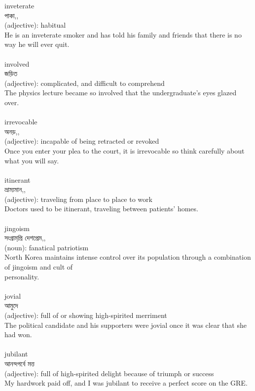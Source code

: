 \documentclass{article}
\begin{document}
{inveterate}\\
{পাকা,,}\\
{(adjective): habitual\\He is an inveterate smoker and has told his family and friends that there is no way he will ever quit.\\}\\
{involved}\\
{জড়িত}\\
{(adjective): complicated, and difficult to comprehend\\The physics lecture became so involved that the undergraduate's eyes glazed over.\\}\\
{irrevocable}\\
{অনড়,,}\\
{(adjective): incapable of being retracted or revoked\\Once you enter your plea to the court, it is irrevocable so think carefully about what you will say.\\}\\
{itinerant}\\
{ভ্রাম্যমান,,}\\
{(adjective): traveling from place to place to work\\Doctors used to be itinerant, traveling between patients' homes.\\}\\
{jingoism}\\
{সংগ্রামপ্রি় দেশপ্রেম,,}\\
{(noun): fanatical patriotism\\North Korea maintains intense control over its population through a combination of jingoism and cult of\\personality.\\}\\
{jovial}\\
{আমুদে}\\
{(adjective): full of or showing high-spirited merriment\\The political candidate and his supporters were jovial once it was clear that she had won.\\}\\
{jubilant}\\
{আনন্দগর্বে মত্ত}\\
{(adjective): full of high-spirited delight because of triumph or success\\My hardwork paid off, and I was jubilant to receive a perfect score on the GRE.\\}\\
\end{document}
